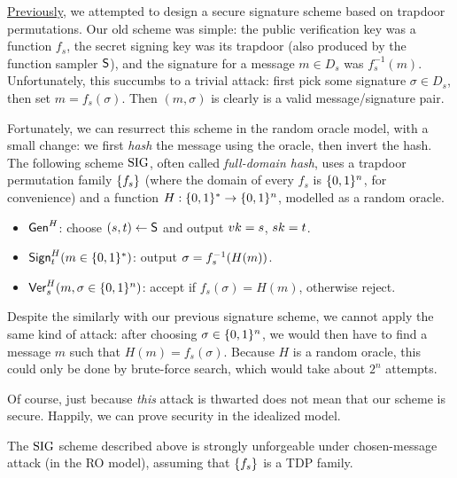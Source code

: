 \documentclass[11pt]{article}
\begin{document}
\href{https://wiki.cc.gatech.edu/theory/images/7/75/Lec12.pdf}{Previously},
we attempted to design a secure signature scheme based on trapdoor
permutations.  Our old scheme was simple: the public verification key
was a function $f_{s}$, the secret signing key was its trapdoor (also
produced by the function sampler $\mathsf{S}$), and the signature for a
message $m \in D_{s}$ was $f_{s}^{-1}(m)$.  Unfortunately, this
succumbs to a trivial attack: first pick some signature $\sigma \in
D_{s}$, then set $m=f_s(\sigma)$.  Then $(m,\sigma)$ is clearly is a
valid message/signature pair.

Fortunately, we can resurrect this scheme in the random oracle model,
with a small change: we first \emph{hash} the message using the
oracle, then invert the hash.  The following scheme $\text{SIG}$, often
called \emph{full-domain hash}, uses a trapdoor permutation family
$\{f_{s}\}$ (where the domain of every $f_{s}$ is $\{0,1\}^{n}$, for
convenience) and a function $H : \{0,1\}^{*} \to \{0,1\}^{n}$, modelled as a
random oracle.
\begin{itemize}
\item $\mathsf{Gen}^{H}$: choose $(s,t) \gets \mathsf{S}$ and output $vk=s$,
  $sk=t$.
\item $\mathsf{Sign}^{H}_{t}(m \in \{0,1\}^{*})$: output $\sigma =
  f_s^{-1}\parens*{H(m)}$.
\item $\mathsf{Ver}^{H}_{s}(m,\sigma \in \{0,1\}^{n})$: accept if
  $f_s(\sigma)=H(m)$, otherwise reject.
\end{itemize}

Despite the similarly with our previous signature scheme, we cannot
apply the same kind of attack: after choosing $\sigma \in \{0,1\}^{n}$,
we would then have to find a message $m$ such that $H(m) =
f_{s}(\sigma)$.  Because $H$ is a random oracle, this could only be
done by brute-force search, which would take about $2^{n}$ attempts.

Of course, just because \emph{this} attack is thwarted does not mean
that our scheme is secure.  Happily, we can prove security in the
idealized model.

\begin{theorem}
  \label{thm:fdh-uf-cma}
  The $\text{SIG}$ scheme described above is strongly unforgeable under
  chosen-message attack (in the RO model), assuming that $\{f_{s}\}$
  is a TDP family.
\end{theorem}
\end{document}
